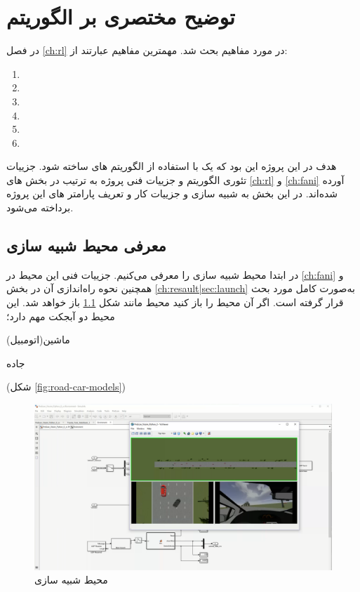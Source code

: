 \chapter{توضیح مختصری بر الگوریتم}\label{ch:alg}

در فصل \ref{ch:rl} در مورد مفاهیم  بحث شد. مهمترین مفاهیم عبارتند از:
\begin{multicols}{3}
\begin{enumerate}
	\item {} \item {} \item {} \item {} \item {} \item {} 
\end{enumerate}
\end{multicols}

هدف در این پروژه این بود که یک  با استفاده از الگوریتم های  ساخته شود. جزییات تئوری الگوریتم و جزییات فنی پروژه به ترتیب در بخش های 
\ref{ch:rl}
و
\ref{ch:fani}
آورده شده‌اند.
در این بخش به شبیه سازی و جزییات کار و تعریف پارامتر های این پروژه برداخته می‌شود.

\section{معرفی محیط شبیه سازی}

در ابتدا محیط شبیه سازی را معرفی می‌کنیم. جزییات فنی این محیط در \ref{ch:fani} و همچنین نحوه راه‌اندازی آن در بخش \ref{ch:resault|sec:launch} به‌صورت کامل مورد بحث قرار گرفته است. اگر آن محیط را باز کنید محیط مانند شکل 
\ref{fig:obs-1}
باز خواهد شد. این محیط دو آبجکت مهم دارد؛
\begin{alphinline}
	\item ماشین(اتومبیل)
	\item جاده
\end{alphinline}
(شکل \ref{fig:road-car-models}) 



\begin{figure}
	\centering
	\includegraphics[width=0.7\linewidth]{Figures/OBS/1}
	\caption{محیط شبیه سازی}
	\label{fig:obs-1}
\end{figure}


